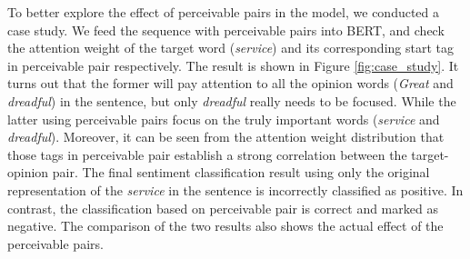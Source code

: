 \documentclass[11pt]{article}
\begin{document}
\begin{table}[t]
    \centering
    
    
    \caption{Performance comparison in complex situations with one-to-many correspondence. All the models mentioned in this table use BERT as the encoder. Due to limited space, we only list the results of two datasets. Similar results can be seen on other datasets.}
    \label{tab:ont_to_many}
    
\end{table}
To better explore the effect of perceivable pairs in the model, we conducted a case study. We feed the sequence with perceivable pairs into BERT, and check the attention weight of the target word (\textit{service}) and its corresponding start tag in perceivable pair respectively. 
The result is shown in Figure \ref{fig:case_study}. It turns out that the former will pay attention to all the opinion words (\textit{Great} and \textit{dreadful}) in the sentence, but only \textit{dreadful} really needs to be focused. While the latter using perceivable pairs focus on the truly important words (\textit{service} and \textit{dreadful}). 
Moreover, it can be seen from the attention weight distribution that those tags in perceivable pair establish a strong correlation between the target-opinion pair.
The final sentiment classification result using only the original 
representation of the \textit{service} in the sentence is incorrectly classified as positive. In contrast, the classification based on perceivable pair is correct and marked as negative. 
The comparison of the two results also shows the actual effect of the perceivable pairs.
\end{document}
